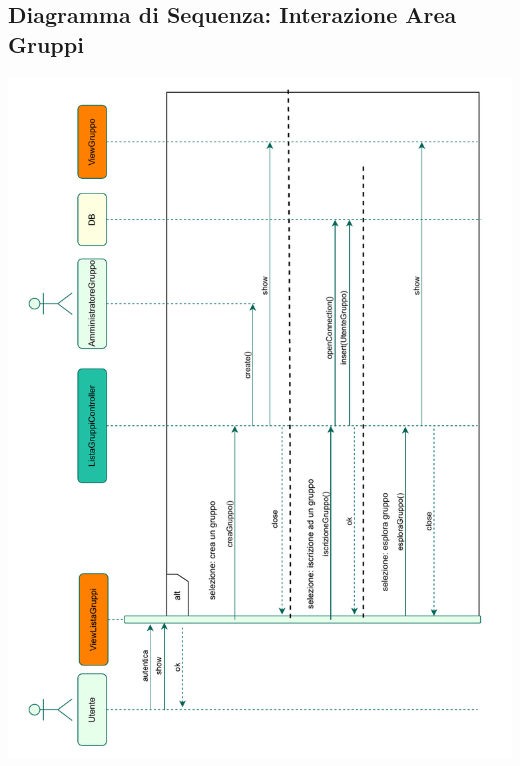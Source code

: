 \subsection*{Diagramma di Sequenza: Interazione Area Gruppi}
{}
\begin{adjustwidth}{-1.5cm}{0cm}
\includegraphics[scale=0.95]{progettazione/Diagramma-Sequenza-Interazione-AreaGruppi.drawio.pdf}
\end{adjustwidth}
\vspace{0.5cm}


